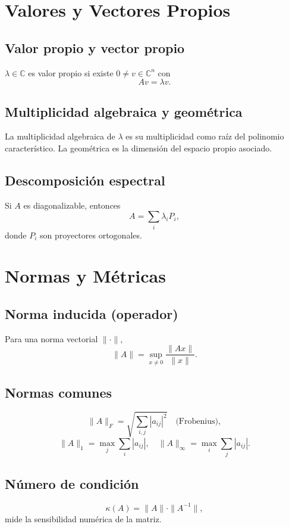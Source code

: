 \documentclass{article}
\begin{document}
\section{Valores y Vectores Propios}

\subsection{Valor propio y vector propio}
\( \lambda \in \mathbb{C} \) es valor propio si existe \( 0 \neq v \in \mathbb{C}^n \) con
\[
A v = \lambda v.
\]


\subsection{Multiplicidad algebraica y geométrica}
La multiplicidad algebraica de \(\lambda\) es su multiplicidad como raíz del polinomio característico. La geométrica es la dimensión del espacio propio asociado.


\subsection{Descomposición espectral}
Si \( A \) es diagonalizable, entonces
\[
A = \sum_{i} \lambda_i P_i,
\]
donde \( P_i \) son proyectores ortogonales.


\section{Normas y Métricas}

\subsection{Norma inducida (operador)}
Para una norma vectorial \( \| \cdot \| \),
\[
\|A\| = \sup_{x \neq 0} \frac{\|Ax\|}{\|x\|}.
\]


\subsection{Normas comunes}
\[
\|A\|_F = \sqrt{\sum_{i,j} |a_{ij}|^2} \quad \text{(Frobenius)},
\]
\[
\|A\|_1 = \max_j \sum_i |a_{ij}|, \quad
\|A\|_\infty = \max_i \sum_j |a_{ij}|.
\]


\subsection{Número de condición}
\[
\kappa(A) = \|A\| \cdot \|A^{-1}\|,
\]
mide la sensibilidad numérica de la matriz.
\end{document}
